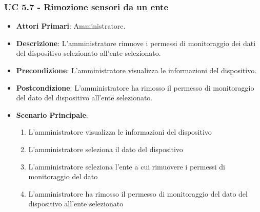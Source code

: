 			\subsubsection{UC 5.7 - Rimozione sensori da un ente}
			\begin{itemize}
				\item \textbf{Attori Primari}: Amministratore.
				\item \textbf{Descrizione}: L'amministratore rimuove i permessi di monitoraggio dei dati del dispositivo selezionato all'ente selezionato.
				\item \textbf{Precondizione}: L'amministratore visualizza le informazioni del dispositivo.
				\item \textbf{Postcondizione}: L'amministratore ha rimosso il permesso di monitoraggio del dato del dispositivo all'ente selezionato.
				\item \textbf{Scenario Principale}:
				\begin{enumerate}
					\item{L'amministratore visualizza le informazioni del dispositivo}
					\item{L'amministratore seleziona il dato del dispositivo}
					\item{L'amministratore seleziona l'ente a cui rimuovere i permessi di monitoraggio del dato}
					\item{L'amministratore ha rimosso il permesso di monitoraggio del dato del dispositivo all'ente selezionato}
				\end{enumerate}
			\end{itemize}